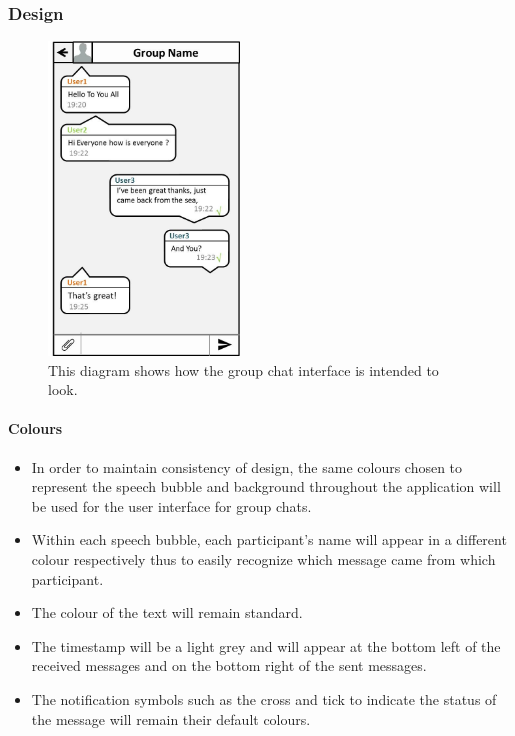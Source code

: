 \documentclass[11pt]{article}
\begin{document}
\subsubsection{Design}
\begin{figure}[H]
\centering
\includegraphics[width=2in]{./images/Final.jpg}
\caption[Sample Group Chat Screen]{This diagram shows how the group chat interface is intended to look.}
\label{cd-group-chat-interface}
\end{figure}

\paragraph{Colours}
\begin{itemize}
\item	In order to maintain consistency of design, the same colours chosen to represent the speech bubble and background throughout the application will be used for the user interface for group chats.
\item	Within each speech bubble, each participant's name will appear in a different colour respectively thus to easily recognize which message came from which participant.
\item	The colour of the text will remain standard.
\item The timestamp will be a light grey and will appear at the bottom left of the received  messages and on the bottom right of the sent messages.
\item The notification symbols such as the cross and tick to indicate the status of the message will remain their default colours.\\
\end{itemize}
\end{document}
